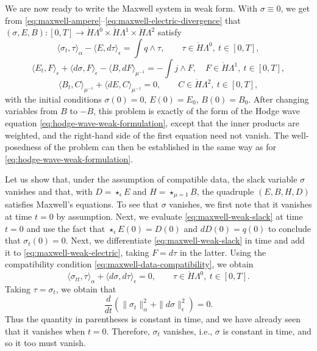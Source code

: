 {We are now ready to write the Maxwell system in weak form. With $\sigma\equiv0$, we get from \eqref{eq:maxwell-ampere}--\eqref{eq:maxwell-electric-divergence} that $(\sigma,E,B):[0,T]\to\mathring H\Lambda^0\times\mathring H\Lambda^1\times\mathring H\Lambda^2$ satisfy}
\begin{equation}\label{eq:maxwell-weak-slack}
\langle\sigma_t,\tau\rangle_\alpha-\langle E,d\tau\rangle_\epsilon=\int q\wedge\tau,\qquad\tau\in\mathring H\Lambda^0,\ t\in[0,T],
\end{equation}
\begin{equation}\label{eq:maxwell-weak-electric}
\langle E_t,F\rangle_\epsilon+\langle d\sigma,F\rangle_\epsilon-\langle B,dF\rangle_{\mu^{-1}}=-\int j\wedge F,\quad F\in\mathring H\Lambda^1,\ t\in[0,T],
\end{equation}
\begin{equation}\label{eq:maxwell-weak-magnetic}
\langle B_t,C\rangle_{\mu^{-1}}+\langle dE,C\rangle_{\mu^{-1}}=0,\qquad C\in\mathring H\Lambda^2,\ t\in[0,T],
\end{equation}
{with the initial conditions $\sigma(0)=0$, $E(0)=E_0$, $B(0)=B_0$. After changing variables from $B$ to $-B$, this problem is exactly of the form of the Hodge wave equation \eqref{eq:hodge-wave-weak-formulation}, except that the inner products are weighted, and the right-hand side of the first equation need not vanish. The well-posedness of the problem can then be established in the same way as for \eqref{eq:hodge-wave-weak-formulation}.}

{Let us show that, under the assumption of compatible data, the slack variable $\sigma$ vanishes and that, with $D=\star_\epsilon E$ and $H=\star_{\mu=1}B$, the quadruple $(E,B,H,D)$ satisfies Maxwell's equations. To see that $\sigma$ vanishes, we first note that it vanishes at time $t=0$ by assumption. Next, we evaluate \eqref{eq:maxwell-weak-slack} at time $t=0$ and use the fact that $\star_\epsilon E(0)=D(0)$ and $dD(0)=q(0)$ to conclude that $\sigma_t(0)=0$. Next, we differentiate \eqref{eq:maxwell-weak-slack} in time and add it to \eqref{eq:maxwell-weak-electric}, taking $F=d\tau$ in the latter. Using the compatibility condition \eqref{eq:maxwell-data-compatibility}, we obtain}
\[
\langle\sigma_{tt},\tau\rangle_\alpha+\langle d\sigma,d\tau\rangle_\epsilon=0,\qquad\tau\in\mathring H\Lambda^0,\ t\in[0,T].
\]
{Taking $\tau=\sigma_t$, we obtain that}
\[
\frac d{dt}(\|\sigma_t\|_\alpha^2+\|d\sigma\|_\epsilon^2)=0.
\]
{Thus the quantity in parentheses is constant in time, and we have already seen that it vanishes when $t=0$. Therefore, $\sigma_t$ vanishes, i.e., $\sigma$ is constant in time, and so it too must vanish.}

